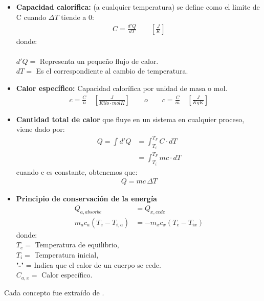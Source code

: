 \documentclass[a4paper, 12p]{article}
\begin{document}
\begin{itemize}
      \item \textbf{Capacidad calorífica: }(a cualquier temperatura) se define como  el limite de C cuando $\varDelta T$ tiende a 0:
      \begin{align}
            C = \frac{d'Q}{dT}           \qquad \left[\frac{J}{K}\right]              
      \end{align}
      donde: \\ \\
      $d'Q = $ Representa un pequeño flujo de calor. \\
      $dT = $ Es el correspondiente al cambio de temperatura. 

      \item \textbf{Calor específico: } Capacidad calorífica por unidad de masa o mol.
      \begin{align}
            c = \frac{C}{n}   \quad \left[\frac{J}{Kilo\cdot molK}\right]  \qquad o  \qquad c = \frac{C}{m} \quad \left[\frac{J}{KgK}\right]
      \end{align}

      \item \textbf{Cantidad total de calor } que fluye en un sistema en cualquier proceso, viene dado por:
      \begin{align}
            Q = \int d'Q &= \int_{T_i}^{T_F} C\cdot dT \\ \nonumber
                         &= \int_{T_i}^{T_F} mc\cdot dT
      \end{align}
      cuando c es constante, obtenemos que:
      \begin{align}
            Q = mc \, \varDelta T
      \end{align}

      \item \textbf{Principio de conservación de la energía}
      \begin{align} \label{p.energia}
            Q_{a,absorbe} &= Q_{x,cede}  \nonumber \\ 
            m_a c_a(T_e - T_{i,a}) &= -m_x c_x (T_e - T_{ix})    
      \end{align}
      donde: \\
      $T_e =$ Temperatura de equilibrio, \\
      $T_i =$ Temperatura inicial, \\
      \textbf{'-'} = Indica que el calor de un cuerpo se cede. \\
      $C_{a,x} =$ Calor específico.

      
\end{itemize} 
Cada concepto fue extraído de \cite{libro}. \\
\end{document}
